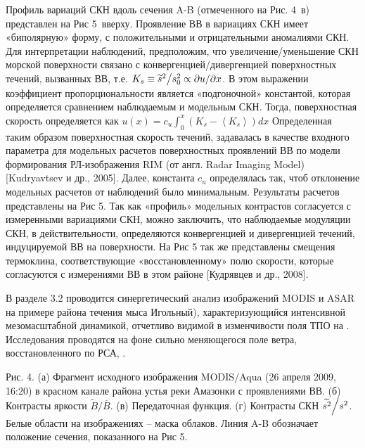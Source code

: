 Профиль вариаций СКН вдоль сечения A-B (отмеченного на Рис. 4~в) представлен на Рис 5~вверху. Проявление ВВ в вариациях СКН имеет «биполярную» форму, с положительными и отрицательными аномалиями СКН. Для интерпретации наблюдений, предположим, что увеличение/уменьшение СКН морской поверхности связано с конвергенцией/дивергенцией поверхностных течений, вызванных ВВ, т.е. $K_{s} \equiv {\widetilde{s}^{2} \mathord{\left/ {\vphantom {\widetilde{s}^{2}  s_{0}^{2} }} \right. \kern-\nulldelimiterspace} s_{0}^{2} } \propto {\partial u\mathord{\left/ {\vphantom {\partial u \partial x}} \right. \kern-\nulldelimiterspace} \partial x} $. В этом выражении коэффициент пропорциональности является «подгоночной» константой, которая определяется сравнением наблюдаемым и модельным СКН. Тогда, поверхностная скорость определяется как $u(x)=c_{u} \int _{0}^{x}\left(K_{s} -\left\langle K_{s} \right\rangle \right)dx $ Определенная таким образом поверхностная скорость течений, задавалась в качестве входного параметра для модельных расчетов поверхностных проявлений ВВ по модели формирования РЛ-изображения RIM (от англ. Radar Imaging Model) [Kudryavtsev и др., 2005]. Далее, константа $c_{u} $ определялась так, чтоб отклонение модельных расчетов от наблюдений было минимальным. Результаты расчетов представлены на Рис 5. Так как «профиль» модельных контрастов согласуется с измеренными вариациями СКН, можно заключить, что наблюдаемые модуляции СКН, в действительности, определяются конвергенцией и дивергенцией течений, индуцируемой ВВ на поверхности. На Рис 5 так же представлены смещения термоклина, соответствующие «восстановленному» полю скорости, которые согласуются с измерениями ВВ в этом районе [Кудрявцев и др., 2008].

В разделе 3.2 проводится синергетический анализ изображений MODIS и ASAR на примере района течения мыса Игольный), характеризующийся интенсивной мезомасштабной динамикой, отчетливо видимой в изменчивости поля ТПО на . Исследования проводятся на фоне сильно меняющегося поле ветра, восстановленного по РСА, . 

Рис. 4. (а) Фрагмент исходного изображения MODIS/Aqua (26 апреля 2009, 16:20) в красном канале района устья реки Амазонки с проявлениями ВВ. (б) Контрасты яркости $\widetilde{B}/\overline{B}$. (в) Передаточная функция. (г) Контрасты СКН ${\widetilde{s^{2} }\mathord{\left/ {\vphantom {\widetilde{s^{2} } s^{2} }} \right. \kern-\nulldelimiterspace} s^{2} } $. Белые области на изображениях -- маска облаков. Линия A-B обозначает положение сечения, показанного на Рис 5.




